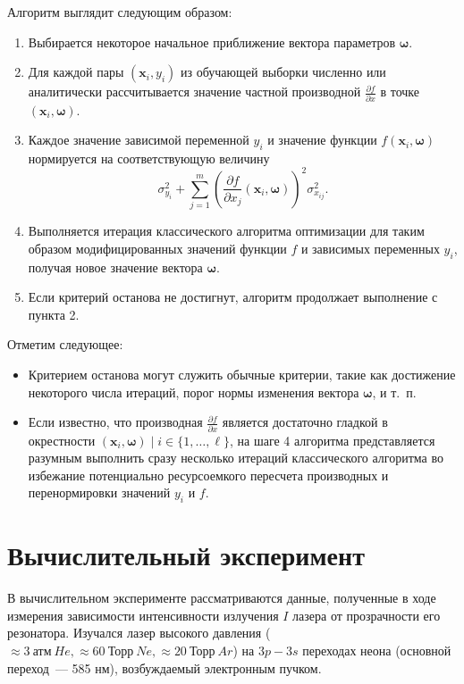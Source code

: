 \documentclass[tikz,10pt,a4paper]{article}
\newcommand{\bomega}{\boldsymbol{\omega}}
\begin{document}
Алгоритм выглядит следующим образом:
\begin{enumerate}
  \item Выбирается некоторое начальное приближение вектора параметров $\bomega$.
  \item Для каждой пары $(\mathbf{x}_i, y_i)$ из обучающей выборки численно или
	аналитически рассчитывается значение частной производной
	$\frac{\partial f}{\partial x}$ в точке $(\mathbf{x}_i, \bomega)$.
  \item Каждое значение зависимой переменной $y_i$ и значение функции $f(\mathbf{x}_i, \bomega)$
	нормируется на соответствующую величину
	\[
	  \sigma_{y_i}^2 + \sum_{j = 1}^m (\frac{\partial f}{\partial x_j}(\mathbf{x}_i, \bomega))^2 \sigma^2_{x_{ij}}.
	\]
  \item Выполняется итерация классического алгоритма оптимизации для таким образом
	модифицированных значений функции $f$ и зависимых переменных $y_i$, получая
	новое значение вектора $\bomega$.
  \item Если критерий останова не достигнут, алгоритм продолжает выполнение с пункта 2.
\end{enumerate}

Отметим следующее:
\begin{itemize}
  \item Критерием останова могут служить обычные критерии, такие как достижение некоторого
    числа итераций, порог нормы изменения вектора $\bomega$, и т.~п.
  \item Если известно, что производная $\frac{\partial f}{\partial x}$ является достаточно гладкой
	в окрестности $(\mathbf{x}_i, \bomega) \mid i \in \{ 1, \dots, \ell \}$, на шаге
	4 алгоритма представляется разумным выполнить сразу несколько итераций
	классического алгоритма во избежание потенциально ресурсоемкого пересчета производных и
	перенормировки значений $y_i$ и $f$.
\end{itemize}

\section{Вычислительный эксперимент}

В вычислительном эксперименте рассматриваются данные, полученные в ходе измерения
зависимости интенсивности излучения $I$ лазера от прозрачности его резонатора.
Изучался лазер высокого давления ($\approx 3\ \text{атм}\ He, \approx 60\ \text{Торр}\ Ne, \approx 20\ \text{Торр}\ Ar$) на
$3p-3s$ переходах неона (основной переход~--- 585 нм), возбуждаемый электронным пучком\cite{alexandrov1991kinetics}.
\end{document}
